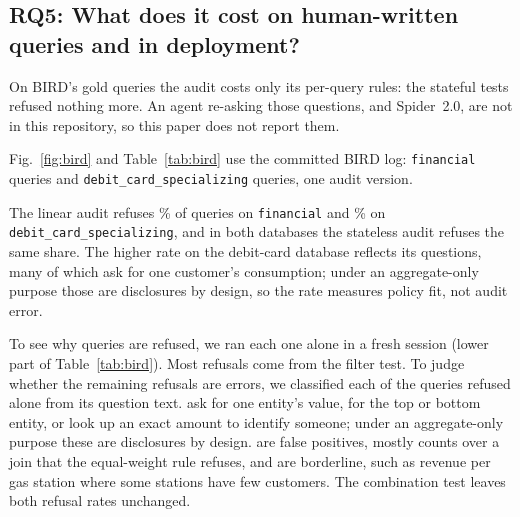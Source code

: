 \documentclass[sigconf,nonacm]{acmart}
\begin{document}
\subsection{RQ5: What does it cost on human-written queries and in deployment?}\label{sec:bird}
On BIRD's gold queries the audit costs only its per-query rules: the stateful tests refused nothing more. An agent re-asking those questions, and Spider~2.0, are not in this repository, so this paper does not report them.

Fig.~\ref{fig:bird} and Table~\ref{tab:bird} use the committed BIRD log: \Nfinnq{} \texttt{financial} queries and \Ndebitnq{} \texttt{debit\_card\_specializing} queries, one audit version.

The linear audit refuses \Nfinreflinear\% of queries on \texttt{financial} and \Ndebitreflinear\% on \texttt{debit\_card\_specializing}, and in both databases the stateless audit refuses the same share. The higher rate on the debit-card database reflects its questions, many of which ask for one customer's consumption; under an aggregate-only purpose those are disclosures by design, so the rate measures policy fit, not audit error.

To see why queries are refused, we ran each one alone in a fresh session (lower part of Table~\ref{tab:bird}). Most refusals come from the filter test. To judge whether the remaining refusals are errors, we classified each of the \Nbirdrefn{} queries refused alone from its question text. \Nbirddesign{} ask for one entity's value, for the top or bottom entity, or look up an exact amount to identify someone; under an aggregate-only purpose these are disclosures by design. \Nbirdfp{} are false positives, mostly counts over a join that the equal-weight rule refuses, and \Nbirdborder{} are borderline, such as revenue per gas station where some stations have few customers. The combination test leaves both refusal rates unchanged.
\end{document}
